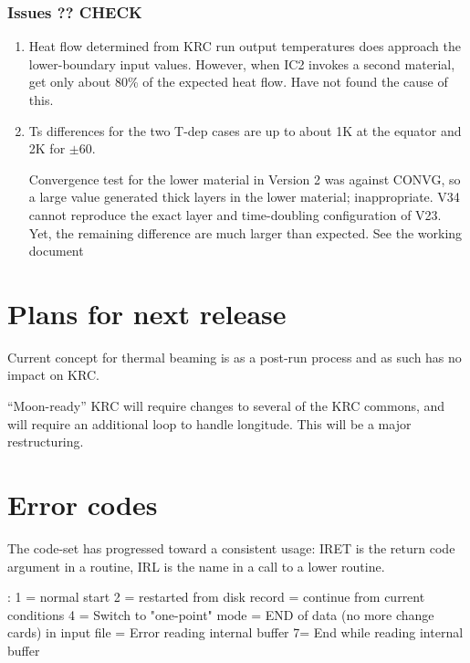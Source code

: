 \documentclass{article}
\begin{document}
\subsubsection{Issues ?? CHECK \label{issu}}  %
\begin{enumerate}    %
 \item 
Heat flow determined from KRC run output temperatures does approach the
lower-boundary input values. However, when IC2 invokes a second material, get
only about 80\% of the expected heat flow. Have not found the cause of this.
 \item 
Ts differences for the two T-dep cases are up to about 1K at the equator and 2K
for $\pm 60$\qd.

Convergence test for the lower material in Version 2 was against CONVG, so a
large value generated thick layers in the lower material; inappropriate.  V34
cannot reproduce the exact layer and time-doubling configuration of V23. Yet,
the remaining difference are much larger than expected. See the working document

\end{enumerate}

\section{Plans for next release \label{plans}} %

Current concept for thermal beaming is as a post-run process and as such has no
impact on KRC.

``Moon-ready'' KRC will require changes to several of the KRC commons, and will
require an additional loop to handle longitude. This will be a major
restructuring.


\section{Error codes}
 The code-set has progressed toward a consistent usage: IRET is the return code argument in a routine,
 IRL is the name in a call to a lower routine.

: 1 = normal start    2 = restarted from disk record
 = continue from current conditions  4 = Switch to "one-point" mode
 = END of data (no more change cards) in input file
= Error reading internal buffer  7= End while reading internal buffer
\end{document}
